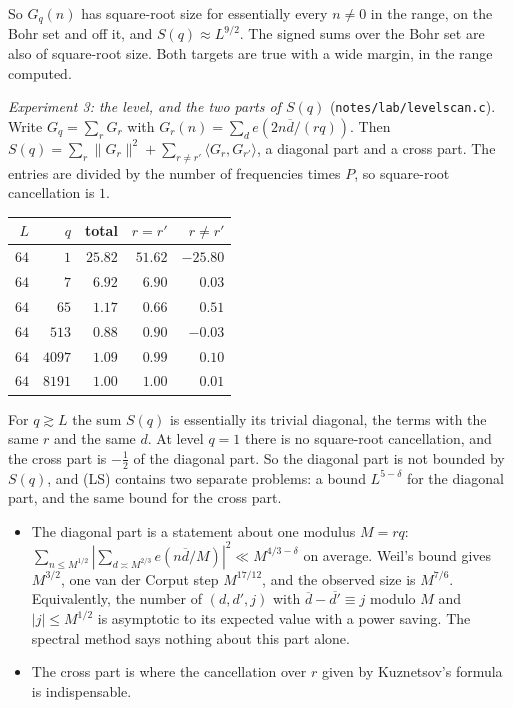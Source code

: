 \documentclass[11pt]{amsart}
\theoremstyle{definition}
\theoremstyle{remark}
\numberwithin{equation}{section}
\newcommand{\inv}[1]{\overline{#1}}
\begin{document}
So $G_q(n)$ has square-root size for essentially every $n\ne0$ in the range,
on the Bohr set and off it, and $S(q)\approx L^{9/2}$.  The signed sums over
the Bohr set are also of square-root size.  Both targets are true with a
wide margin, in the range computed.

\emph{Experiment 3: the level, and the two parts of $S(q)$}
(\texttt{notes/lab/levelscan.c}).  Write $G_q=\sum_rG_r$ with
$G_r(n)=\sum_de(2n\inv d/(rq))$.  Then
$S(q)=\sum_r\|G_r\|^2+\sum_{r\ne r'}\langle G_r,G_{r'}\rangle$, a diagonal
part and a cross part.  The entries are divided by the number of
frequencies times $P$, so square-root cancellation is $1$.

\medskip
\begin{center}
\begin{tabular}{rrrrr}
$L$ & $q$ & total & $r=r'$ & $r\ne r'$\\ \hline
$64$ & $1$ & $25.82$ & $51.62$ & $-25.80$\\
$64$ & $7$ & $6.92$ & $6.90$ & $0.03$\\
$64$ & $65$ & $1.17$ & $0.66$ & $0.51$\\
$64$ & $513$ & $0.88$ & $0.90$ & $-0.03$\\
$64$ & $4097$ & $1.09$ & $0.99$ & $0.10$\\
$64$ & $8191$ & $1.00$ & $1.00$ & $0.01$
\end{tabular}
\end{center}
\medskip

For $q\gtrsim L$ the sum $S(q)$ is essentially its trivial diagonal, the
terms with the same $r$ and the same $d$.  At level $q=1$ there is no
square-root cancellation, and the cross part is $-\tfrac12$ of the diagonal
part.  So the diagonal part is not bounded by $S(q)$, and (LS) contains two
separate problems: a bound $L^{5-\delta}$ for the diagonal part, and the
same bound for the cross part.
\begin{itemize}
\item The diagonal part is a statement about one modulus $M=rq$:
$\sum_{n\le M^{1/2}}|\sum_{d\asymp M^{2/3}}e(n\inv d/M)|^2\ll M^{4/3-\delta}$
on average.  Weil's bound gives $M^{3/2}$, one van der Corput step
$M^{17/12}$, and the observed size is $M^{7/6}$.  Equivalently, the number
of $(d,d',j)$ with $\inv d-\inv{d'}\equiv j$ modulo $M$ and
$|j|\le M^{1/2}$ is asymptotic to its expected value with a power saving.
The spectral method says nothing about this part alone.
\item The cross part is where the cancellation over $r$ given by
Kuznetsov's formula is indispensable.
\end{itemize}
\end{document}
